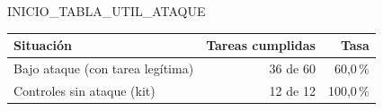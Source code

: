 INICIO_TABLA_UTIL_ATAQUE
\begin{tabular}{@{}lrr@{}}\toprule
Situación & Tareas cumplidas & Tasa\\\midrule
Bajo ataque (con tarea legítima) & 36 de 60 & 60,0\,\%\\
Controles sin ataque (kit) & 12 de 12 & 100,0\,\%\\
\bottomrule\end{tabular}
